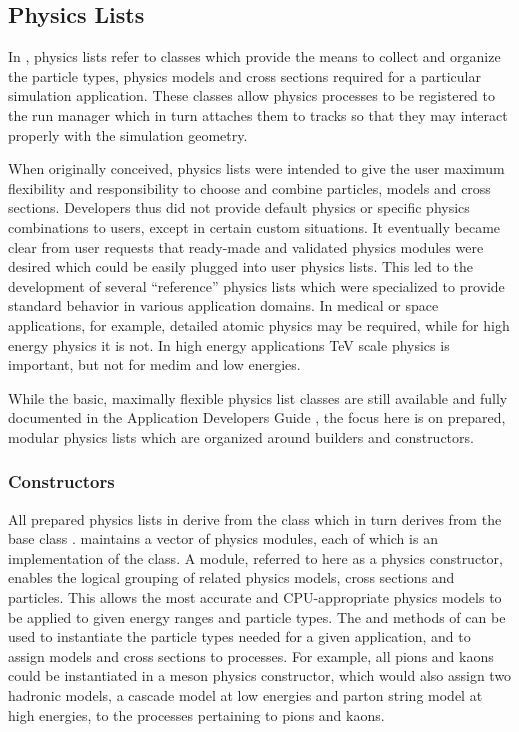 \label{sec:physlists}
\subsection{\textbf{Physics Lists}}
In \Gfour{}, physics lists refer to classes which provide the means to collect
and organize the particle types, physics models and cross sections required for
a particular simulation application.  These classes allow physics processes to 
be registered to the run manager which in turn attaches them to tracks so that 
they may interact properly with the simulation geometry.

When originally conceived, physics lists were intended to give the user maximum 
flexibility and responsibility to choose and combine particles, models and cross
sections.  Developers thus did not provide default physics or specific physics 
combinations to users, except in certain custom situations.  It eventually 
became clear from user requests that ready-made and validated physics modules 
were desired which could be easily plugged into user physics lists.  This led to
the development of several ``reference'' physics lists which were specialized to
provide standard behavior in various application domains.  In medical or space 
applications, for example, detailed atomic physics may be required, while for 
high energy physics it is not.  In high energy applications TeV scale physics is
important, but not for medim and low energies.   

While the basic, maximally flexible physics list classes are still available
and fully documented in the \Gfour{} Application Developers Guide
\cite{bib:AppDevGuide}, the focus here is on prepared, modular physics lists 
which are organized around builders and constructors.  

\subsubsection{Constructors} \label{subsec:ctors}
All prepared physics lists in \Gfour{} derive from the class
 which in turn derives from the base
class .  
maintains a vector of physics modules, each of which is an implementation of the 
 class.  A module, referred to here 
as a physics constructor, enables the logical grouping of related physics 
models, cross 
sections and particles.  This allows the most accurate and CPU-appropriate 
physics models to be applied to given energy ranges and particle types.  The 
 and  methods of 
 can be used to instantiate the 
particle types needed for a given application, and to assign models and cross
sections to 
processes.  For example, all pions and kaons could be instantiated in a meson 
physics constructor, which would also assign two hadronic models, a cascade 
model at low energies and parton string model at high energies, to the 
processes pertaining to pions and kaons.

